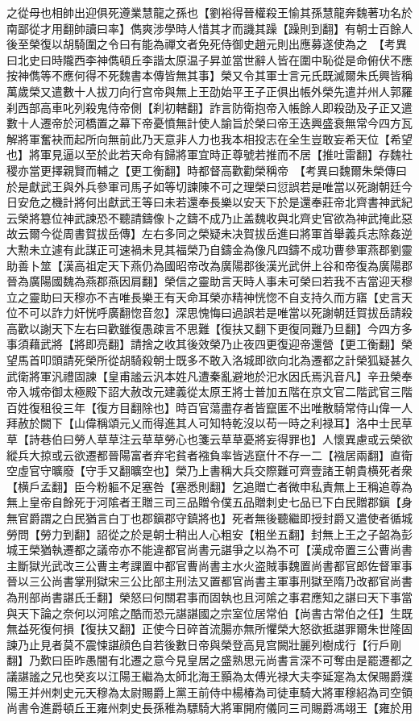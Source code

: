 之從母也相帥出迎俱死遵業慧龍之孫也【劉裕得晉權殺王愉其孫慧龍奔魏著功名於南鄙從才用翻帥讀曰率】儁爽涉學時人惜其才而譏其躁【躁則到翻】有朝士百餘人後至榮復以胡騎圍之令曰有能為禪文者免死侍御史趙元則出應募遂使為之　【考異曰北史曰時隴西李神儁頓丘李諧太原温子昇並當世辭人皆在圍中恥從是命俯伏不應按神儁等不應何得不死魏書本傳皆無其事】榮又令其軍士言元氏既滅爾朱氏興皆稱萬歲榮又遣數十人拔刀向行宫帝與無上王劭始平王子正俱出帳外榮先遣并州人郭羅刹西部高車叱列殺鬼侍帝側【刹初轄翻】詐言防衛抱帝入帳餘人即殺劭及子正又遣數十人遷帝於河橋置之幕下帝憂憤無計使人諭旨於榮曰帝王迭興盛衰無常今四方瓦解將軍奮袂而起所向無前此乃天意非人力也我本相投志在全生豈敢妄希天位【希望也】將軍見逼以至於此若天命有歸將軍宜時正尊號若推而不居【推吐雷翻】存魏社稷亦當更擇親賢而輔之【更工衡翻】時都督高歡勸榮稱帝　【考異曰魏爾朱榮傳曰於是獻武王與外兵參軍司馬子如等切諫陳不可之理榮曰愆誤若是唯當以死謝朝廷今日安危之機計將何出獻武王等曰未若還奉長樂以安天下於是還奉莊帝北齊書神武紀云榮將簒位神武諫恐不聽請鑄像卜之鑄不成乃止盖魏收與北齊史官欲為神武掩此惡故云爾今從周書賀拔岳傳】左右多同之榮疑未决賀拔岳進曰將軍首舉義兵志除姦逆大勲未立遽有此謀正可速禍未見其福榮乃自鑄金為像凡四鑄不成功曹參軍燕郡劉靈助善卜筮【漢高祖定天下燕仍為國昭帝改為廣陽郡後漢光武併上谷和帝復為廣陽郡晉為廣陽國魏為燕郡燕因肩翻】榮信之靈助言天時人事未可榮曰若我不吉當迎天穆立之靈助曰天穆亦不吉唯長樂王有天命耳榮亦精神恍惚不自支持久而方寤【史言天位不可以詐力奸恍呼廣翻惚音忽】深思愧悔曰過誤若是唯當以死謝朝廷賀拔岳請殺高歡以謝天下左右曰歡雖復愚疎言不思難【復扶又翻下更復同難乃旦翻】今四方多事須藉武將【將即亮翻】請捨之收其後效榮乃止夜四更復迎帝還營【更工衡翻】榮望馬首叩頭請死榮所從胡騎殺朝士既多不敢入洛城即欲向北為遷都之計榮狐疑甚久武衛將軍汎禮固諫【皇甫謐云汎本姓凡遭秦亂避地於汜水因氏焉汎音凡】辛丑榮奉帝入城帝御太極殿下詔大赦改元建義從太原王將士普加五階在京文官二階武官三階百姓復租役三年【復方目翻除也】時百官蕩盡存者皆竄匿不出唯散騎常侍山偉一人拜赦於闕下【山偉稱頌元乂而得進其人可知特乾沒以苟一時之利禄耳】洛中士民草草【詩巷伯曰勞人草草注云草草勞心也箋云草草憂將妄得罪也】人懷異慮或云榮欲縱兵大掠或云欲遷都晉陽富者弃宅貧者襁負率皆逃竄什不存一二【襁居兩翻】直衛空虛官守曠廢【守手又翻曠空也】榮乃上書稱大兵交際難可齊壹諸王朝貴横死者衆【横戶孟翻】臣今粉軀不足塞咎【塞悉則翻】乞追贈亡者微申私責無上王稱追尊為無上皇帝自餘死于河隂者王贈三司三品贈令僕五品贈刺史七品已下白民贈郡鎭【身無官爵謂之白民猶言白丁也郡鎭郡守鎮將也】死者無後聽繼即授封爵又遣使者循城勞問【勞力到翻】詔從之於是朝士稍出人心粗安【粗坐五翻】封無上王之子韶為彭城王榮猶執遷都之議帝亦不能違都官尚書元諶爭之以為不可【漢成帝置三公曹尚書主斷獄光武改三公曹主考課置中都官曹尚書主水火盗賊事魏置尚書都官郎佐督軍事晉以三公尚書掌刑獄宋三公比部主刑法又置都官尚書主軍事刑獄至隋乃改都官尚書為刑部尚書諶氏壬翻】榮怒曰何關君事而固執也且河隂之事君應知之諶曰天下事當與天下論之奈何以河隂之酷而恐元諶諶國之宗室位居常伯【尚書古常伯之任】生既無益死復何損【復扶又翻】正使今日碎首流腸亦無所懼榮大怒欲抵諶罪爾朱世隆固諫乃止見者莫不震悚諶顔色自若後數日帝與榮登高見宫闕壯麗列樹成行【行戶剛翻】乃歎曰臣昨愚闇有北遷之意今見皇居之盛熟思元尚書言深不可奪由是罷遷都之議諶謐之兄也癸亥以江陽王繼為太師北海王顥為太傅光禄大夫李延寔為太保賜爵濮陽王并州刺史元天穆為太尉賜爵上黨王前侍中楊椿為司徒車騎大將軍穆紹為司空領尚書令進爵頓丘王雍州刺史長孫稚為驃騎大將軍開府儀同三司賜爵馮翊王【雍於用